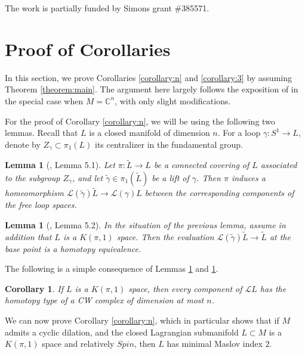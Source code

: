 \documentclass[a4paper]{article}
\newtheorem{corollary}[theorem]{Corollary}
\newtheorem{lemma}[theorem]{Lemma}
\numberwithin{equation}{section}
\begin{document}
The work is partially funded by Simons grant \#385571.

\section{Proof of Corollaries}\label{section:corollary}

In this section, we prove Corollaries \ref{corollary:n} and \ref{corollary:3} by assuming Theorem \ref{theorem:main}. The argument here largely follows the exposition of \cite{jlt} in the special case when $M=\mathbb{C}^n$, with only slight modifications.

For the proof of Corollary \ref{corollary:n}, we will be using the following two lemmas. Recall that $L$ is a closed manifold of dimension $n$. For a loop $\gamma:S^1\rightarrow L$, denote by $Z_\gamma\subset\pi_1(L)$ its centralizer in the fundamental group. 

\begin{lemma}[\cite{jlt}, Lemma 5.1]\label{lemma:homeo}
Let $\pi:\widetilde{L}\rightarrow L$ be a connected covering of $L$ associated to the subgroup $Z_\gamma$, and let $\tilde{\gamma}\in\pi_1(\widetilde{L})$ be a lift of $\gamma$. Then $\pi$ induces a homeomorphism $\mathcal{L}(\tilde{\gamma})\widetilde{L}\rightarrow\mathcal{L}(\gamma)L$ between the corresponding components of the free loop spaces.
\end{lemma}

\begin{lemma}[\cite{jlt}, Lemma 5.2]\label{lemma:h-equiv}
In the situation of the previous lemma, assume in addition that $L$ is a $K(\pi,1)$ space. Then the evaluation $\mathcal{L}(\tilde{\gamma})\widetilde{L}\rightarrow\widetilde{L}$ at the base point is a homotopy equivalence.
\end{lemma}

The following is a simple consequence of Lemmas \ref{lemma:homeo} and \ref{lemma:h-equiv}.

\begin{corollary}\label{corollary:h-type}
If $L$ is a $K(\pi,1)$ space, then every component of $\mathcal{L}L$ has the homotopy type of a CW complex of dimension at most $n$.
\end{corollary}

We can now prove Corollary \ref{corollary:n}, which in particular shows that if $M$ admits a cyclic dilation, and the closed Lagrangian submanifold $L\subset M$ is a $K(\pi,1)$ space and relatively $\mathit{Spin}$, then $L$ has minimal Maslov index $2$.
\end{document}
